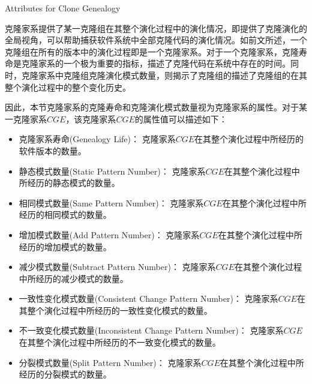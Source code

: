 {Attributes for Clone Genealogy}

克隆家系提供了某一克隆组在其整个演化过程中的演化情况，即提供了克隆演化的全局视角，可以帮助捕获软件系统中全部克隆代码的演化情况。如前文所述，一个克隆组在所有的版本中的演化过程即是一个克隆家系。对于一个克隆家系，克隆寿命是克隆家系的一个极为重要的指标，描述了克隆代码在系统中存在的时间。同时，克隆家系中克隆组克隆演化模式数量，则揭示了克隆组的描述了克隆组的在其整个演化过程中的整个变化历史。

因此，本节克隆家系的克隆寿命和克隆演化模式数量视为克隆家系的属性。对于某一克隆家系{$CGE$}，该克隆家系{$CGE$}的属性值可以描述如下：

\begin{itemize}
\item
克隆家系寿命(Genealogy  Life)：
克隆家系{$CGE$}在其整个演化过程中所经历的软件版本的数量。
\item
静态模式数量(Static Pattern Number)：
克隆家系{$CGE$}在其整个演化过程中所经历的静态模式的数量。
\item
相同模式数量(Same Pattern Number)：
克隆家系{$CGE$}在其整个演化过程中所经历的相同模式的数量。
\item
增加模式数量(Add Pattern Number)：
克隆家系{$CGE$}在其整个演化过程中所经历的增加模式的数量。
\item
减少模式数量(Subtract Pattern Number)：
克隆家系{$CGE$}在其整个演化过程中所经历的减少模式的数量。
\item
一致性变化模式数量(Consistent Change Pattern Number)：
克隆家系{$CGE$}在其整个演化过程中所经历的一致性变化模式的数量。
\item
不一致变化模式数量(Inconsistent Change Pattern Number)：
克隆家系{$CGE$}在其整个演化过程中所经历的不一致变化模式的数量。
\item
分裂模式数量(Split Pattern Number)：
克隆家系{$CGE$}在其整个演化过程中所经历的分裂模式的数量。
\end{itemize}


